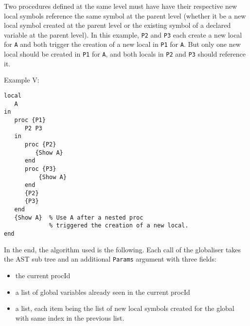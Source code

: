 \documentclass[a4paper]{memoir}
\begin{document}
Two procedures defined at the same level must have have their respective new local symbols reference the same symbol at the parent level (whether it be a new local symbol created at the parent level or the existing symbol of a declared variable at the parent level). In this example, \lstinline!P2! and \lstinline!P3! each create a new local for \lstinline!A! and both trigger the creation of a new local in \lstinline!P1! for \lstinline!A!. But only one new local should be created in \lstinline!P1! for \lstinline!A!, and both locals in \lstinline!P2! and \lstinline!P3! should reference it.


Example V:
\begin{lstlisting}
local
   A
in
   proc {P1}
      P2 P3
   in
      proc {P2}
         {Show A}
      end
      proc {P3}
          {Show A}
      end
      {P2}
      {P3}
   end
   {Show A}  % Use A after a nested proc 
             % triggered the creation of a new local.
end
\end{lstlisting}

In the end, the algorithm used is the following.
Each call of the globaliser takes the AST sub tree and an additional \lstinline!Params! argument with three fields:
\begin{itemize}
   \item the current procId
   \item a list of global variables already seen in the current procId
   \item a list, each item being the list of new local symbols created for the global with same index in the previous list.
\end{itemize}
\end{document}
